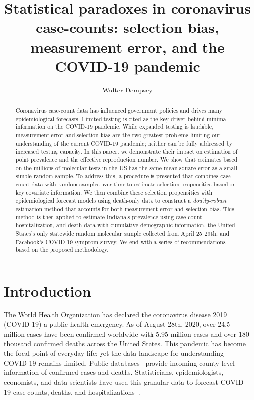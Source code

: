 \documentclass[11pt]{amsart}
\begin{document}
\title[Statistical paradoxes in coronavirus case-counts]{Statistical paradoxes in coronavirus case-counts: selection bias, measurement error, and the COVID-19 pandemic} %

\author{Walter Dempsey}
\address{Department of Biostatistics, University of Michigan, Ann Arbor, MI 48109}

\begin{abstract}
  Coronavirus case-count data has influenced government policies and drives many epidemiological forecasts. Limited testing is cited as the key driver behind minimal information on the COVID-19 pandemic. While expanded testing is laudable, measurement error and selection bias are the two greatest problems limiting our understanding of the current COVID-19 pandemic; neither can be fully addressed by increased testing capacity. In this paper, we demonstrate their impact on estimation of point prevalence and the effective reproduction number. We show that estimates based on the millions of molecular tests in the US has the same mean square error as a small simple random sample.  To address this, a procedure is presented that combines case-count data with random samples over time to estimate selection propensities based on key covariate information. We then combine these selection propensities with epidemiological forecast models using death-only data to construct a \emph{doubly-robust} estimation method that accounts for both measurement-error and selection bias.  This method is then applied to estimate Indiana's prevalence using case-count, hospitalization, and death data with cumulative demographic information, the United States's only statewide random molecular sample collected from April 25--29th, and Facebook's COVID-19 symptom survey.  We end with a series of recommendations based on the proposed methodology.
\end{abstract}

\maketitle


\section{Introduction}
The World Health Organization has declared the coronavirus disease 2019 (COVID-19) a public health emergency.  As of August 28th, 2020, over 24.5 million cases have been confirmed worldwide with 5.95 million cases and over 180 thousand confirmed deaths across the United States. This pandemic
has become the focal point of everyday life; yet the data landscape for understanding COVID-19 remains limited.  Public databases~\citep{JHU_Lancet,NYT} provide incoming county-level information of confirmed cases and deaths.  Statisticians, epidemiologists, economists, and data scientists have used this granular data to forecast COVID-19 case-counts, deaths, and hospitalizations~\citep{Giordano2020,Song2020,Ray2020,2020.IHME,Wang2020.03,JTD36385}.
\end{document}
